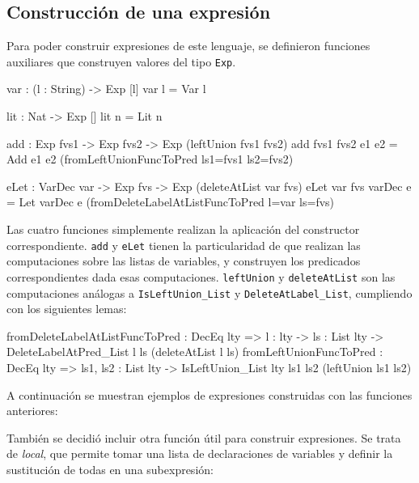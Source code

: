 \subsection{Construcción de una expresión}

Para poder construir expresiones de este lenguaje, se definieron funciones auxiliares que construyen valores del tipo \texttt{Exp}.

\begin{code}
var : (l : String) -> Exp [l]
var l = Var l

lit : Nat -> Exp []
lit n = Lit n

add : Exp fvs1 -> Exp fvs2 -> Exp (leftUnion fvs1 fvs2)
add {fvs1} {fvs2} e1 e2 = Add e1 e2
  (fromLeftUnionFuncToPred {ls1=fvs1} {ls2=fvs2})

eLet : VarDec var -> Exp fvs -> Exp (deleteAtList var fvs)
eLet {var} {fvs} varDec e = Let varDec e 
  (fromDeleteLabelAtListFuncToPred {l=var} {ls=fvs})
\end{code}

Las cuatro funciones simplemente realizan la aplicación del constructor correspondiente. \texttt{add} y \texttt{eLet} tienen la particularidad de que realizan las computaciones sobre las listas de variables, y construyen los predicados correspondientes dada esas computaciones. \texttt{leftUnion} y \texttt{deleteAtList} son las computaciones análogas a \texttt{IsLeftUnion\_List} y \texttt{DeleteAtLabel\_List}, cumpliendo con los siguientes lemas:

\begin{code}
fromDeleteLabelAtListFuncToPred : DecEq lty => {l : lty} -> 
  {ls : List lty} -> 
  DeleteLabelAtPred_List l ls (deleteAtList l ls)
fromLeftUnionFuncToPred : DecEq lty => {ls1, ls2 : List lty} -> 
  IsLeftUnion_List {lty} ls1 ls2 (leftUnion ls1 ls2)   
\end{code}

A continuación se muestran ejemplos de expresiones construidas con las funciones anteriores:

También se decidió incluir otra función útil para construir expresiones. Se trata de \textit{local}, que permite tomar una lista de declaraciones de variables y definir la sustitución de todas en una subexpresión:

